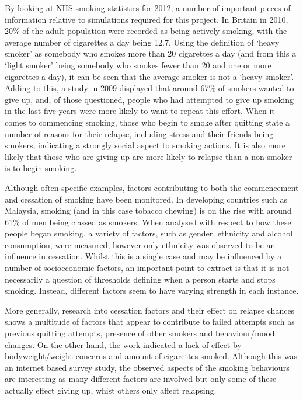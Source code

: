 \documentclass[]{report}
\begin{document}
By looking at NHS smoking statistics for 2012\cite{NHS-13}, a number of important pieces of information relative to simulations required for this project. In Britain in 2010, 20\% of the adult population were recorded as being actively smoking, with the average number of cigarettes a day being 12.7\cite{NHS-13}. Using the definition of `heavy smoker' as somebody who smokes more than 20 cigarettes a day\cite{NHS-14} (and from this a `light smoker' being somebody who smokes fewer than 20 and one or more cigarettes a day), it can be seen that the average smoker is not a `heavy smoker'. Adding to this, a study in 2009 displayed that around 67\% of smokers wanted to give up, and, of those questioned, people who had attempted to give up smoking in the last five years were more likely to want to repeat this effort\cite{SmokOmni}. When it comes to commencing smoking, those who begin to smoke after quitting state a number of reasons for their relapse, including stress and their friends being smokers\cite{NHS-43}, indicating a strongly social aspect to smoking actions. It is also more likely that those who are giving up are more likely to relapse than a non-smoker is to begin smoking\cite{NHS-43}.

Although often specific examples, factors contributing to both the commencement and cessation of smoking have been monitored. In developing countries such as Malaysia, smoking (and in this case tobacco chewing) is on the rise with around 61\% of men being classed as smokers\cite{malay}. When analysed with respect to how these people began smoking, a variety of factors, such as gender, ethnicity and alcohol consumption, were measured, however only ethnicity was observed to be an influence in cessation. Whilst this is a single case and may be influenced by a number of socioeconomic factors, an important point to extract is that it is not necessarily a question of thresholds defining when a person starts and stops smoking. Instead, different factors seem to have varying strength in each instance.

More generally, research into cessation factors and their effect on relapse chances shows a multitude of factors that appear to contribute to failed attempts such as previous quitting attempts, presence of other smokers and behaviour/mood changes\cite{UCL-cess}. On the other hand, the work indicated a lack of effect by bodyweight/weight concerns and amount of cigarettes smoked. Although this was an internet based survey study, the observed aspects of the smoking behaviours are interesting as many different factors are involved but only some of these actually effect giving up, whist others only affect relapsing.
\end{document}

